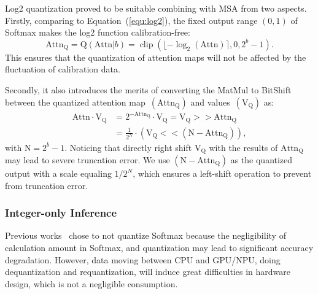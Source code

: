 \documentclass{article}
\begin{document}
Log2 quantization proved to be suitable combining with MSA from two aspects. Firstly, comparing to Equation~(\ref{equ:log2}), the fixed output range $(\textrm{0},\textrm{1})$ of Softmax makes the log2 function calibration-free:
\begin{equation}
     \textrm{Attn}_\textrm{Q} = \textrm{Q}(\textrm{Attn}|b) = \operatorname{clip}(\lfloor-\log_\textrm{2}(\textrm{Attn})\rceil, \textrm{0}, \textrm{2}^b-\textrm{1}).
\end{equation}
This ensures that the quantization of attention maps will not be affected by the fluctuation of calibration data.

Secondly, it also introduces the merits of converting the MatMul to BitShift between the quantized attention map~$(\textrm{Attn}_\textrm{Q})$ and values~$(\textrm{V}_\textrm{Q})$ as:
\begin{align}
    \textrm{Attn}\cdot \textrm{V}_\textrm{Q} &= \textrm{2}^{-\textrm{Attn}_\textrm{Q}} \cdot \textrm{V}_\textrm{Q}
    = \textrm{V}_\textrm{Q}>>\textrm{Attn}_\textrm{Q} \\ &= \frac{\textrm{1}}{\textrm{2}^N} \cdot (\textrm{V}_\textrm{Q}<<(\textrm{N}-\textrm{Attn}_\textrm{Q})),
    \label{equ:bitshift_attn}
\end{align}
with $\textrm{N} = \textrm{2}^b-\textrm{1}$.
Noticing that directly right shift $\textrm{V}_\textrm{Q}$ with the results of $\textrm{Attn}_\textrm{Q}$ may lead to severe truncation error. We use $(\textrm{N}-\textrm{Attn}_\textrm{Q})$ as the quantized output with a scale equaling $\textrm{1}/{\textrm{2}^N}$, which ensures a left-shift operation to prevent from truncation error.



\subsubsection{Integer-only Inference}


Previous works~\cite{liu2021post} chose to not quantize Softmax because the negligibility of calculation amount in Softmax, and quantization may lead to significant accuracy degradation. However, data moving between CPU and GPU/NPU, doing dequantization and requantization, will induce great difficulties in hardware design, which is not a negligible consumption.
\end{document}
